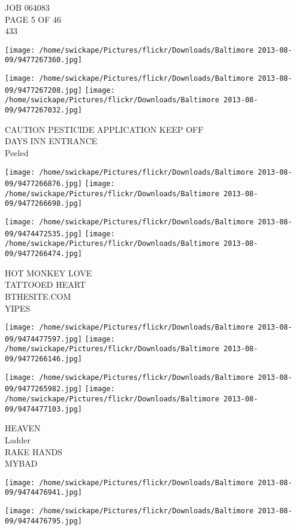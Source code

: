 \documentclass[10pt,letterpaper]{article}
\begin{document}
JOB 064083\\
PAGE 5 OF 46\\
433
\pagebreak

\texttt{[image: /home/swickape/Pictures/flickr/Downloads/Baltimore 2013-08-09/9477267360.jpg]}

\vspace{0.25in}
\texttt{[image: /home/swickape/Pictures/flickr/Downloads/Baltimore 2013-08-09/9477267208.jpg]}
\texttt{[image: /home/swickape/Pictures/flickr/Downloads/Baltimore 2013-08-09/9477267032.jpg]}

CAUTION PESTICIDE APPLICATION KEEP OFF\\
DAYS INN ENTRANCE\\
Peeled
\pagebreak

\texttt{[image: /home/swickape/Pictures/flickr/Downloads/Baltimore 2013-08-09/9477266876.jpg]}
\texttt{[image: /home/swickape/Pictures/flickr/Downloads/Baltimore 2013-08-09/9477266698.jpg]}

\texttt{[image: /home/swickape/Pictures/flickr/Downloads/Baltimore 2013-08-09/9474472535.jpg]}
\texttt{[image: /home/swickape/Pictures/flickr/Downloads/Baltimore 2013-08-09/9477266474.jpg]}

HOT MONKEY LOVE\\
TATTOOED HEART\\
BTHESITE.COM\\
YIPES
\pagebreak

\texttt{[image: /home/swickape/Pictures/flickr/Downloads/Baltimore 2013-08-09/9474477597.jpg]}
\texttt{[image: /home/swickape/Pictures/flickr/Downloads/Baltimore 2013-08-09/9477266146.jpg]}

\texttt{[image: /home/swickape/Pictures/flickr/Downloads/Baltimore 2013-08-09/9477265982.jpg]}
\texttt{[image: /home/swickape/Pictures/flickr/Downloads/Baltimore 2013-08-09/9474477103.jpg]}

HEAVEN\\
Ladder\\
RAKE HANDS\\
MYBAD
\pagebreak

\texttt{[image: /home/swickape/Pictures/flickr/Downloads/Baltimore 2013-08-09/9474476941.jpg]}

\vspace{0.25in}
\texttt{[image: /home/swickape/Pictures/flickr/Downloads/Baltimore 2013-08-09/9474476795.jpg]}
\end{document}
